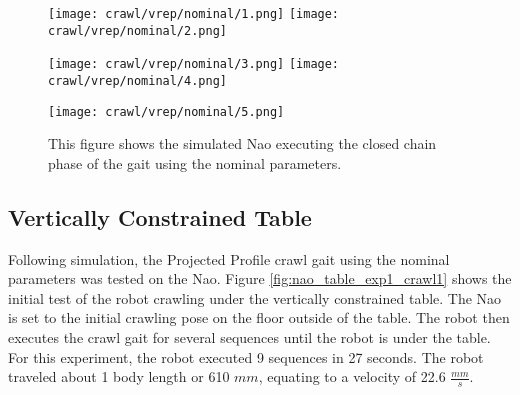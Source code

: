 \begin{figure}
  \centerline{
    \texttt{[image: crawl/vrep/nominal/1.png]}
    \texttt{[image: crawl/vrep/nominal/2.png]}
  }
  \centerline{
    \texttt{[image: crawl/vrep/nominal/3.png]}
    \texttt{[image: crawl/vrep/nominal/4.png]}
  }
  \centerline{
    \texttt{[image: crawl/vrep/nominal/5.png]}
  }
  \caption{This figure shows the simulated Nao executing the closed chain phase
           of the gait using the nominal parameters.}
  \label{fig:vrep_nao_nom_gait1}
\end{figure}

\subsection{Vertically Constrained Table}


Following simulation, the Projected Profile crawl gait using the nominal parameters
was tested on the Nao. Figure \ref{fig:nao_table_exp1_crawl1} shows the initial test of the
robot crawling under the vertically constrained table. The Nao is set to the initial
crawling pose on the floor outside of the table. The robot then executes the crawl
gait for several sequences until the robot is under the table.
For this experiment, the robot executed 9 sequences in 27 seconds. The robot traveled
about 1 body length or 610 $mm$, equating to a velocity of 22.6 $\frac{mm}{s}$.


